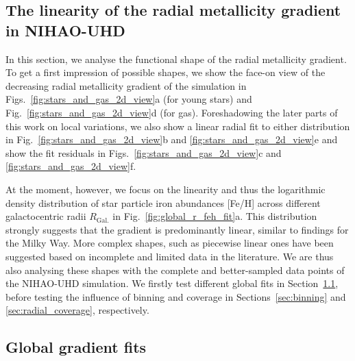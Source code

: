 \documentclass[twocolumn,apj,numberedappendix,appendixfloats]{openjournal}
\begin{document}
\begin{CJK*}{UTF8}{gbsn}
\section{The linearity of the radial metallicity gradient in NIHAO-UHD}
\label{sec:linear_radial_metallicity_gradients}

In this section, we analyse the functional shape of the radial metallicity gradient. To get a first impression of possible shapes, we show the face-on view of the decreasing radial metallicity gradient of the simulation in Figs.~\ref{fig:stars_and_gas_2d_view}a (for young stars) and Fig.~\ref{fig:stars_and_gas_2d_view}d (for gas). Foreshadowing the later parts of this work on local variations, we also show a linear radial fit to either distribution in Fig.~\ref{fig:stars_and_gas_2d_view}b and \ref{fig:stars_and_gas_2d_view}e and show the fit residuals in Figs.~\ref{fig:stars_and_gas_2d_view}c and \ref{fig:stars_and_gas_2d_view}f.

At the moment, however, we focus on the linearity and thus the logarithmic density distribution of star particle iron abundances [Fe/H] across different galactocentric radii $R_\mathrm{Gal.}$ in Fig.~\ref{fig:global_r_feh_fit}a. This distribution strongly suggests that the gradient is predominantly linear, similar to findings for the Milky Way. More complex shapes, such as piecewise linear ones have been suggested based on incomplete and limited data in the literature. We are thus also analysing these shapes with the complete and better-sampled data points of the NIHAO-UHD simulation. We firstly test different global fits in Section~\ref{sec:global_fits}, before testing the influence of binning and coverage in Sections~\ref{sec:binning} and \ref{sec:radial_coverage}, respectively.

\subsection{Global gradient fits}
\label{sec:global_fits}


\end{CJK*}
\end{document}
